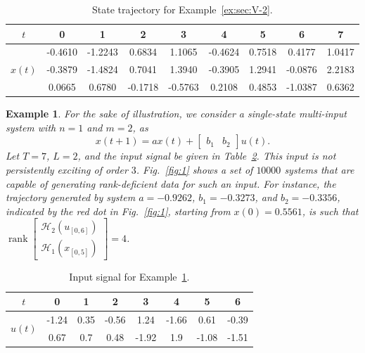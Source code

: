 \documentclass[journal,twoside,web]{ieeecolor}
\newtheorem{example}[theorem]{Example}
\DeclareMathOperator{\rank}{rank}
\begin{document}
\begin{table}[h]
    \centering
    \caption{State trajectory for Example~\ref{ex:sec:V-2}.}
    \begin{tabular}{c|cccccccc}
       $t$  & 0 & 1 & 2 & 3 & 4 & 5 & 6 & 7 \\ \hline
       \multirow{3}{*}{$x(t)$} & -0.4610 & -1.2243  &  0.6834  &  1.1065 & -0.4624 &   0.7518  &  0.4177  &  1.0417 \\
              & -0.3879 &  -1.4824  &  0.7041 &   1.3940 & -0.3905  &  1.2941 &  -0.0876  &  2.2183 \\
              & 0.0665  &  0.6780 & -0.1718 &  -0.5763 &   0.2108  &  0.4853 &  -1.0387  &  0.6362
    \end{tabular}
    \label{table:3}
\end{table}

\begin{example}
\label{ex:sec:V-1}
For the sake of illustration, we consider a single-state multi-input system with $n=1$ and $m=2$, as
\begin{equation}
x(t+1)=ax(t)+\begin{bmatrix}
b_1 & b_2
\end{bmatrix}u(t).
\end{equation}
Let $T=7$, $L=2$, and the input signal be given in Table~\ref{table:1}. This input is not persistently exciting of order $3$. Fig.~\ref{fig:1} shows a set of $10000$ systems that are capable of generating rank-deficient data for such an input. For instance, the trajectory generated by system $a=-0.9262$, $b_1=-0.3273$, and \linebreak $b_2=-0.3356$, indicated by the red dot in Fig.~\ref{fig:1}, starting from $x(0)= 0.5561$, is such that $\rank\begin{bmatrix}
\mathcal{H}_2(u_{[0,6]}) \\
\mathcal{H}_1(x_{[0,5]}) 
\end{bmatrix}=4$. 
\end{example}

\begin{table}[h]
    \centering
    \caption{Input signal for Example~\ref{ex:sec:V-1}.}
    \begin{tabular}{c|ccccccc}
       $t$  & 0 & 1 & 2 & 3 & 4 & 5 & 6 \\ \hline
       \multirow{2}{*}{$u(t)$} & -1.24 & 0.35 & -0.56 & 1.24 & -1.66 & 0.61 & -0.39 \\
        & 0.67 & 0.7 & 0.48 & -1.92 & 1.9 & -1.08 &  -1.51
    \end{tabular}
    \label{table:1}
\end{table}
\end{document}
